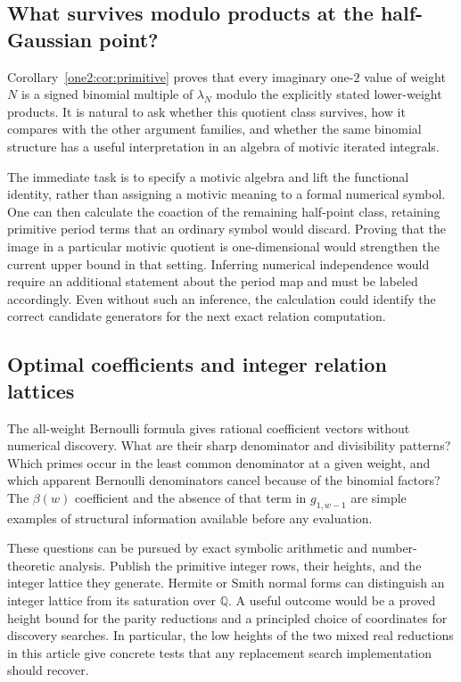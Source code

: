 \subsection{What survives modulo products at the half-Gaussian point?}

Corollary~\ref{one2:cor:primitive} proves that every imaginary one-$2$
value of weight $N$ is a signed binomial multiple of $\lambda_N$
modulo the explicitly stated lower-weight products. It is natural to
ask whether this quotient class survives, how it compares with the
other argument families, and whether the same binomial structure
has a useful interpretation in an algebra of motivic iterated
integrals.

The immediate task is to specify a motivic algebra and lift the
functional identity, rather than assigning a motivic meaning to a
formal numerical symbol. One can then calculate the coaction of
the remaining half-point class, retaining primitive period terms
that an ordinary symbol would discard. Proving that the image in
a particular motivic quotient is one-dimensional would strengthen
the current upper bound in that setting. Inferring numerical
independence would require an additional statement about the
period map and must be labeled accordingly. Even without such
an inference, the calculation could identify the correct candidate
generators for the next exact relation computation.

\subsection{Optimal coefficients and integer relation lattices}

The all-weight Bernoulli formula gives rational coefficient vectors
without numerical discovery. What are their sharp denominator and
divisibility patterns? Which primes occur in the least common
denominator at a given weight, and which apparent Bernoulli
denominators cancel because of the binomial factors? The
$\beta(w)$ coefficient and the absence of that term in $g_{1,w-1}$
are simple examples of structural information available before
any evaluation.

These questions can be pursued by exact symbolic arithmetic and
number-theoretic analysis. Publish the primitive integer rows,
their heights, and the integer lattice they generate. Hermite or
Smith normal forms can distinguish an integer lattice from its
saturation over $\mathbb Q$. A useful outcome would be a proved
height bound for the parity reductions and a principled choice of
coordinates for discovery searches. In particular, the low heights
of the two mixed real reductions in this article give concrete
tests that any replacement search implementation should recover.

